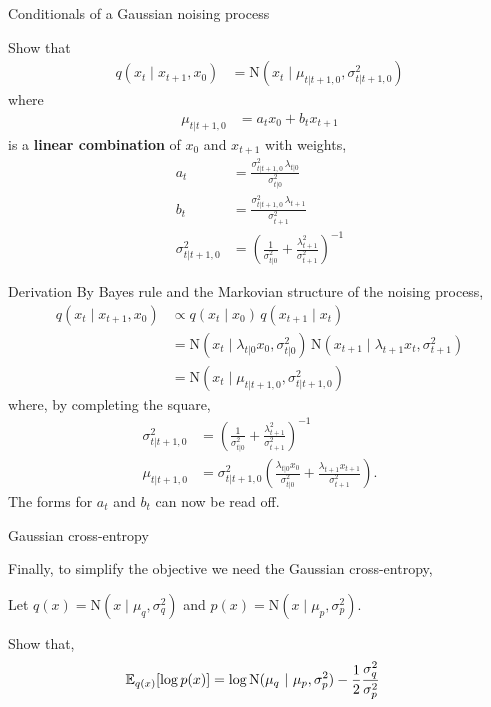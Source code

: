 \documentclass[aspectratio=169]{beamer}
\begin{document}
\begin{frame}[t,allowframebreaks]{Conditionals of a Gaussian noising process}

Show that 
\begin{align*}
q(x_t \mid x_{t+1}, x_0) 
&= \mathrm{N}(x_t \mid \mu_{t|t+1,0}, \sigma_{t|t+1,0}^2)
\end{align*} 
where 
\begin{align*}
\mu_{t|t+1,0} &= a_t x_0 + b_t x_{t+1}
\end{align*} 
is a \textbf{linear combination} of \(x_0\) and \(x_{t+1}\)
with weights, 
\begin{align*}
a_t &= \frac{\sigma_{t|t+1,0}^2 \, \lambda_{t|0} }{\sigma_{t|0}^2}  \\
b_t &= \frac{\sigma_{t|t+1,0}^2 \, \lambda_{t+1}}{\sigma_{t+1}^2} \\
\sigma_{t|t+1,0}^2  
&= \left(\frac{1}{\sigma_{t|0}^2} + \frac{\lambda_{t+1}^2}{\sigma_{t+1}^2} \right)^{-1} 
\end{align*}
\end{frame}

\begin{frame}[t,allowframebreaks]{Derivation}
By Bayes rule and the Markovian structure of the noising process, 
\begin{align*}
q(x_t \mid x_{t+1}, x_0) 
&\propto q(x_t \mid x_0) \, q(x_{t+1} \mid x_t) \\
&= \mathrm{N}(x_t \mid \lambda_{t|0} x_0, \sigma_{t|0}^2) \, \mathrm{N}(x_{t+1} \mid \lambda_{t+1} x_t, \sigma_{t+1}^2) \\
&= \mathrm{N}(x_t \mid \mu_{t|t+1,0}, \sigma_{t|t+1,0}^2) 
\end{align*} 
where, by completing the square, \begin{align*}
\sigma_{t|t+1,0}^2 &= \left(\frac{1}{\sigma_{t|0}^2} + \frac{\lambda_{t+1}^2}{\sigma_{t+1}^2} \right)^{-1} \\
\mu_{t|t+1,0} &= \sigma_{t|t+1,0}^2 \left(\frac{\lambda_{t|0} x_0}{\sigma_{t|0}^2} + \frac{\lambda_{t+1} x_{t+1}}{\sigma_{t+1}^2} \right).
\end{align*} 
The forms for \(a_t\) and \(b_t\) can now be read off.
\end{frame}

\begin{frame}[t,allowframebreaks]{Gaussian cross-entropy}

Finally, to simplify the objective we need the Gaussian cross-entropy,

Let \(q(x) = \mathrm{N}(x \mid \mu_q, \sigma_q^2)\) and
\(p(x) = \mathrm{N}(x \mid \mu_p, \sigma_p^2)\). 

Show that,
\begin{align*}
\mathbb{E}_{q(x)}[\log p(x)] &= \log \mathrm{N}(\mu_q ~\vert~ \mu_p, \sigma_p^2) -\frac{1}{2} \frac{\sigma_q^2}{\sigma_p^2}
\end{align*} 
\end{frame}
\end{document}
